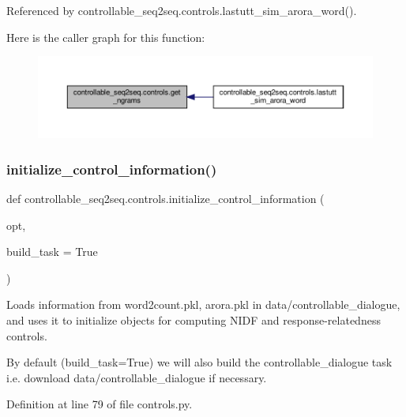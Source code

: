 Referenced by controllable\+\_\+seq2seq.\+controls.\+lastutt\+\_\+sim\+\_\+arora\+\_\+word().

Here is the caller graph for this function\+:
\nopagebreak
\begin{figure}[H]
\begin{center}
\leavevmode
\includegraphics[width=350pt]{namespacecontrollable__seq2seq_1_1controls_a3fad33534b785e9e43e2145199347e05_icgraph}
\end{center}
\end{figure}
\mbox{\label{namespacecontrollable__seq2seq_1_1controls_a7c6540f026d763dbf534f1a3e60500a3}} 
\subsubsection{\texorpdfstring{initialize\+\_\+control\+\_\+information()}{initialize\_control\_information()}}
{\footnotesize\ttfamily def controllable\+\_\+seq2seq.\+controls.\+initialize\+\_\+control\+\_\+information (\begin{DoxyParamCaption}\item[{}]{opt,  }\item[{}]{build\+\_\+task = {\ttfamily True} }\end{DoxyParamCaption})}

\begin{DoxyVerb}Loads information from word2count.pkl, arora.pkl in data/controllable_dialogue, and
uses it to initialize objects for computing NIDF and response-relatedness controls.

By default (build_task=True) we will also build the controllable_dialogue task i.e.
download data/controllable_dialogue if necessary.
\end{DoxyVerb}
 

Definition at line 79 of file controls.\+py.




